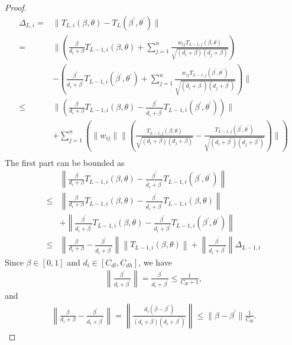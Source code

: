 \begin{proof}
    \begin{align*}
    \Delta_{L, i} 
    =& \|T_{L, i}(\beta, \theta) - T_L(\beta^\prime, \theta^\prime)\|\\
    =& \|\left(\frac{\beta}{d_i + \beta}T_{L-1, i}(\beta, \theta) + \sum_{j=1}^n \frac{w_{ij} T_{L-1, j}(\beta, \theta)}{\sqrt{(d_i+\beta)(d_j + \beta)}}\right) \\
    &- \left(\frac{\beta^\prime}{d_i + \beta^\prime}T_{L-1, i}(\beta^\prime, \theta^\prime) + \sum_{j=1}^n \frac{w_{ij} T_{L-1, j}(\beta^\prime, \theta^\prime)}{\sqrt{(d_i+\beta^\prime)(d_j + \beta^\prime)}}\right)\|\\
    \leq& \|\left(\frac{\beta}{d_i + \beta}T_{L-1, i}(\beta, \theta)-\frac{\beta^\prime}{d_i + \beta^\prime}T_{L-1, i}(\beta^\prime, \theta^\prime)\right)\| \\
    &+ \sum_{j=1}^n \left(\|w_{ij}\| \|\left( \frac{T_{L-1, j}(\beta, \theta)}{\sqrt{(d_i+\beta)(d_j + \beta)}} - \frac{ T_{L-1, j}(\beta^\prime, \theta^\prime)}{\sqrt{(d_i+\beta^\prime)(d_j + \beta^\prime)}}\right)\|\right) \tag{by triangle inequality}\\
\end{align*}
The first part can be bounded as
\begin{align*}
    & \left\|\frac{\beta}{d_i + \beta}T_{L-1, i}(\beta, \theta)-\frac{\beta^\prime}{d_i + \beta^\prime}T_{L-1, i}(\beta^\prime, \theta^\prime)\right\|\\
    \leq & \left\| 
    \frac{\beta}{d_i + \beta}T_{L-1, i}(\beta, \theta)
    -\frac{\beta^\prime}{d_i + \beta^\prime}T_{L-1, i}(\beta, \theta)\right\| \\
    &+\left\|\frac{\beta^\prime}{d_i + \beta^\prime}T_{L-1, i}(\beta, \theta)
    - \frac{\beta^\prime}{d_i + \beta^\prime}T_{L-1, i}(\beta^\prime, \theta^\prime) 
    \right\| \tag{by triangle inequality}\\
    \leq & \left\| \frac{\beta}{d_i + \beta} - \frac{\beta^\prime}{d_i + \beta^\prime} \right\|\left\|T_{L-1, i} (\beta,\theta)\right\|
    +\left\|\frac{\beta^\prime}{d_i + \beta^\prime}\right\|
    \Delta_{L-1, i}\tag{by Cauchy-Schwarz inequality}
\end{align*}
Since $\beta \in [0,1]$ and $d_i \in [C_{dl}, C_{dh}]$, we have
\begin{align*}
    \left\|\frac{\beta^\prime}{d_i + \beta^\prime}\right\|
    = \frac{\beta^\prime}{d_i + \beta^\prime}
    \leq \frac{1}{C_{dl}+1},
\end{align*}
and
\begin{align*}
    \left\| \frac{\beta}{d_i + \beta} - \frac{\beta^\prime}{d_i + \beta^\prime} \right\|
    = \left\|\frac{d_i(\beta - \beta^\prime)}{(d_i+\beta)(d_i + \beta^\prime)}\right\|
    \leq \|\beta-\beta^\prime\| \frac{1}{C_{dl}}.
\end{align*}


\end{proof}

